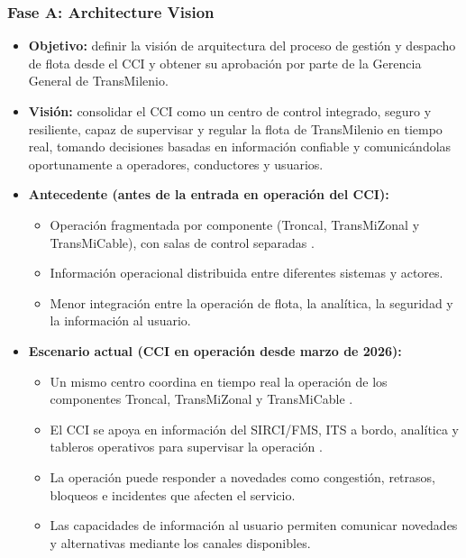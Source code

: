 \begin{singlespace}
\subsubsection*{Fase A: Architecture Vision}

\begin{itemize}
	\item \textbf{Objetivo:} definir la visión de arquitectura del proceso de gestión y despacho de flota desde el CCI y obtener su aprobación por parte de la Gerencia General de TransMilenio.
	\item \textbf{Visión:} consolidar el CCI como un centro de control integrado, seguro y resiliente, capaz de supervisar y regular la flota de TransMilenio en tiempo real, tomando decisiones basadas en información confiable y comunicándolas oportunamente a operadores, conductores y usuarios.
	\item \textbf{Antecedente (antes de la entrada en operación del CCI):}
	\begin{itemize}
		\item[$\Rightarrow$] Operación fragmentada por componente (Troncal, TransMiZonal y TransMiCable), con salas de control separadas \parencite{transmilenio2026cci}.
		\item[$\Rightarrow$] Información operacional distribuida entre diferentes sistemas y actores.
		\item[$\Rightarrow$] Menor integración entre la operación de flota, la analítica, la seguridad y la información al usuario.
	\end{itemize}
	\item \textbf{Escenario actual (CCI en operación desde marzo de 2026):}
	\begin{itemize}
		\item[$\Rightarrow$] Un mismo centro coordina en tiempo real la operación de los componentes Troncal, TransMiZonal y TransMiCable \parencite{transmilenio2026cci}.
		\item[$\Rightarrow$] El CCI se apoya en información del SIRCI/FMS, ITS a bordo, analítica y tableros operativos para supervisar la operación \parencite{transmilenio2020peti,transmilenio2026cci}.
		\item[$\Rightarrow$] La operación puede responder a novedades como congestión, retrasos, bloqueos e incidentes que afecten el servicio.
		\item[$\Rightarrow$] Las capacidades de información al usuario permiten comunicar novedades y alternativas mediante los canales disponibles.
	\end{itemize}

\end{itemize}
\end{singlespace}
